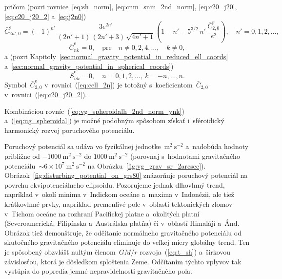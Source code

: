 \documentclass[a4paper,12pt]{book}
\begin{document}
%
pričom (pozri rovnice~\ref{eq:sh_norm}, \ref{eq:cnm_snm_2nd_norm}, 
\ref{eq:c20_j20}, \ref{eq:c20_j20_2} a~\ref{eq:j2n0})
%
\begin{equation}
\label{eq:cell_2n}
\bar{C}^\mathrm{e}_{2n',0} = (-1)^{n'} \, \frac{3e^{2n'}}{(2n' + 1) \, (2n' 
+ 3) \, \sqrt{4n' + 1}} \left( 1 - n' - 5^{3 \slash 2} \, n' \, 
\frac{\bar{C}^\mathrm{e}_{2,0}}{e^2} \right){,} \quad n' = 0, 1, 2,\dots{,}
\end{equation}
%
\begin{equation}
\bar{C}^\mathrm{e}_{nk} = 0{,} \quad \textrm{pre} \quad n \neq 0, 2, 4,\dots, 
\quad k \neq 0{,}
\end{equation}
%
a (pozri Kapitoly~\ref{sec:normal_gravity_potential_in_reduced_ell_coords} 
a~\ref{sec:normal_gravity_potential_in_spherical_coords})
%
\begin{equation}
\bar{S}^\mathrm{e}_{nk} = 0{,} \quad n = 0, 1, 2,\dots, \ k = -n, \dots, n{.}
\end{equation}
%
Symbol~$\bar{C}^\mathrm{e}_{2,0}$ v~rovnici~(\ref{eq:cell_2n}) je totožný 
s~koeficientom~$\bar{C}_{2,0}$ v~rovnici~(\ref{eq:c20_j20_2}).

Kombináciou rovníc~(\ref{eq:vg_spheroidalh_2nd_norm_ynk}) 
a~(\ref{eq:ug_spheroidal}) je možné podobným spôsobom získať i~sféroidický 
harmonický rozvoj poruchového potenciálu.

Poruchový potenciál sa udáva vo fyzikálnej jednotke~$\mathrm{m}^2 
\ \mathrm{s}^{-2}$ a~nadobúda hodnoty približne od $-1000\ \mathrm{m}^2 
\ \mathrm{s}^{-2}$ do $1000 \ \mathrm{m}^2 \ \mathrm{s}^{-2}$ (porovnaj 
s~hodnotami gravitačného potenciálu~${\sim}6 \times 10^7\ \mathrm{m}^2 
\ \mathrm{s}^{-2}$ na Obrázku~\ref{fig:vg_grav_sr_2arcsec}).  
Obrázok~\ref{fig:disturbing_potential_on_grs80} znázorňuje poruchový potenciál 
na povrchu ekvipotenciálneho elipsoidu.  Pozorujeme jednak dlhovlnný trend, 
napríklad v~okolí minima v~Indickom oceáne a~maxima v~Indonézii, ale tiež 
krátkovlnné prvky, napríklad premenlivé pole v~oblasti tektonických zlomov 
v~Tichom oceáne na rozhraní Pacifickej platne a~okolitých platní 
(Severoamerická, Filipínska a~Austrálska platňa) či v~oblastí Himalájí a~Ánd.  
Obrázok tiež demonštruje, že odčítanie normálneho gravitačného potenciálu od 
skutočného gravitačného potenciálu eliminuje do veľkej miery globálny trend.  
Ten je spôsobený obzvlášť nultým členom~$GM \slash r$ rozvoja~(\ref{eq:t_sh}) 
a~šírkovou závislosťou, ktorá je dôsledkom sploštenia Zeme.  Odčítaním týchto 
vplyvov tak vystúpia do popredia jemné nepravidelnosti gravitačného poľa.
\end{document}
